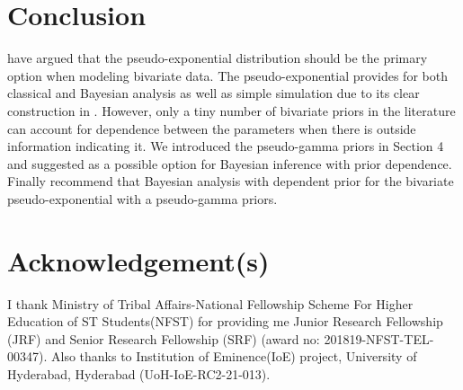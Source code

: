 \documentclass[12pt]{article}    %
\numberwithin{equation}{section}
\begin{document}
\begin{table}
	\caption{{per Capita GDP and Infant Mortality rate dataset (sub-model-II)}} 
	\label{Table_sub_I}
	\normalsize
	\centering %
	
\end{table}


			
\section{Conclusion}		
\cite{BM2019} have argued that the pseudo-exponential distribution should be the primary option when modeling bivariate data. The pseudo-exponential provides for both classical and Bayesian analysis as well as simple simulation due to its clear construction in \cite{bbb2022}. However, only a tiny number of bivariate priors in the literature can account for dependence between the parameters when there is outside information indicating it. We introduced the pseudo-gamma priors in Section 4 and suggested as a possible option for Bayesian inference with prior dependence. Finally recommend that Bayesian analysis with dependent prior  for the bivariate  pseudo-exponential with a pseudo-gamma priors.
\section{Acknowledgement(s)}
I thank Ministry of Tribal Affairs-National Fellowship Scheme For Higher Education of ST Students(NFST) for providing me Junior Research Fellowship (JRF) and Senior Research Fellowship (SRF) (award no: 201819-NFST-TEL-00347). Also thanks to Institution of Eminence(IoE) project, University of Hyderabad, Hyderabad (UoH-IoE-RC2-21-013).
			
\end{document}
